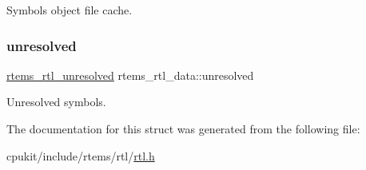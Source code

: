 Symbols object file cache. \mbox{\label{structrtems__rtl__data_aa020bb1fec139cbc15a1e6bc53f397d1}} 
\subsubsection{\texorpdfstring{unresolved}{unresolved}}
{\footnotesize\ttfamily \mbox{\hyperlink{structrtems__rtl__unresolved}{rtems\+\_\+rtl\+\_\+unresolved}} rtems\+\_\+rtl\+\_\+data\+::unresolved}

Unresolved symbols. 

The documentation for this struct was generated from the following file\+:\begin{DoxyCompactItemize}
\item 
cpukit/include/rtems/rtl/\mbox{\hyperlink{rtl_8h}{rtl.\+h}}\end{DoxyCompactItemize}

